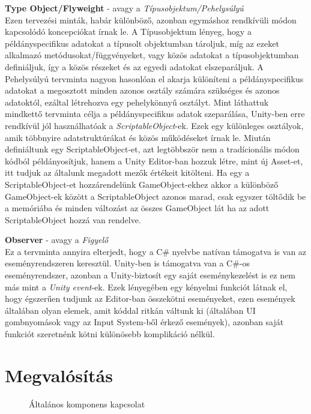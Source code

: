 \textbf{Type Object/Flyweight} - avagy a \textit{Típusobjektum/Pehelysúlyú}\\
Ezen tervezési minták, habár különböző, azonban egymáshoz rendkívüli módon kapcsolódó koncepciókat írnak le. A Típusobjektum lényeg, hogy a példányspecifikus adatokat a típusolt objektumban tároljuk, míg az ezeket alkalmazó metódusokat/függvényeket, vagy közös adatokat a típusobjektumban definiáljuk, így a közös részeket és az egyedi adatokat elszeparáljuk. A Pehelysúlyú tervminta nagyon hasonlóan el akarja különíteni a példányspecifikus adatokat a megosztott minden azonos osztály számára szükséges és azonos adatoktól, ezáltal létrehozva egy pehelykönnyű osztályt. Mint láthattuk mindkettő tervminta célja a példányspecifikus adatok szeparálása, Unity-ben erre rendkívül jól használhatóak a \textit{ScriptableObject}-ek. Ezek egy különleges osztályok, amik többnyire adatstruktúrákat és közös működéseket írnak le. Miután definiáltunk egy ScriptableObject-et, azt legtöbbször nem a tradícionális módon kódból példányosítjuk, hanem a Unity Editor-ban hozzuk létre, mint új Asset-et, itt tudjuk az általunk megadott mezők értékeit kitölteni. Ha egy a ScriptableObject-et hozzárendelünk GameObject-ekhez akkor a különböző GameObject-ek között a ScriptableObject azonos marad, csak egyszer töltődik be a memóriába és minden változást az összes GameObject lát ha az adott ScriptableObject hozzá van rendelve.

\textbf{Observer} - avagy a \textit{Figyelő}\\
Ez a tervminta annyira elterjedt, hogy a C\# nyelvbe natívan támogatva is van az eseményrendszeren keresztül. Unity-ben is támogatva van a C\#-os eseményrendszer, azonban a Unity-biztosít egy saját eseménykezelést is ez nem más mint a \textit{Unity event}-ek. Ezek lényegében egy kényelmi funkciót látnak el, hogy égszerűen tudjunk az Editor-ban összekötni eseményeket, ezen események általában olyan elemek, amit kóddal ritkán váltunk ki (általában UI gombnyomások vagy az Input System-ből érkező események), azonban saját funkciót szeretnénk kötni különösebb komplikáció nélkül.


\cleardoublepage
\section{Megvalósítás}

\begin{figure}[H]
	\noindent{}
	\caption{Általános komponens kapcsolat}
	\label{GeneralComponentSystem}
\end{figure}

